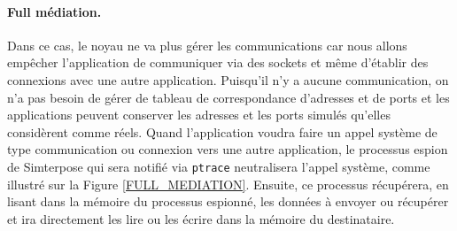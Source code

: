 \paragraph{Full médiation.} \label{paragraph:FULL_MEDIATION}
Dans ce cas, le noyau ne va plus gérer les communications car nous allons
empêcher l'application de communiquer via des sockets et même d'établir des
connexions avec une autre application. Puisqu'il n'y a aucune communication, on
n'a pas besoin de gérer de tableau de correspondance d'adresses et de ports et
les applications peuvent conserver les adresses et les ports simulés qu'elles
considèrent comme réels. Quand l'application voudra faire un appel système de
type communication ou connexion vers une autre application, le processus espion
de Simterpose qui sera notifié via \texttt{ptrace} neutralisera l'appel système,
comme illustré sur la Figure \ref{FULL_MEDIATION}. Ensuite, ce processus
récupérera, en lisant dans la mémoire du processus espionné, les données à
envoyer ou récupérer et ira directement les lire ou les écrire dans la mémoire
du destinataire.

